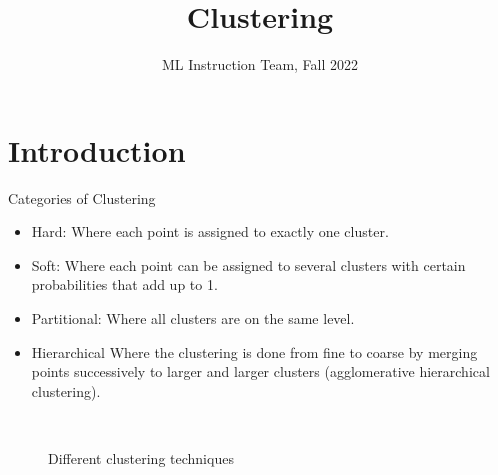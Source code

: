 \documentclass[compress,oilve]{beamer}
\title{Clustering}
\author{ML Instruction Team, Fall 2022}
\institute[]{CE Department \newline  Sharif University of Technology \newline \newline}
\date[\today]{}
\newcommand{\tc}[2]{
	\textcolor{#1}{\hspace{-2pt}#2\hspace{-2pt}}
}
\begin{document}
	
	\fontsize{9}{9}
\begin{frame}
	\titlepage
\end{frame}

\section{Introduction}

\begin{frame}{Categories of Clustering}
	\begin{itemize}
		\item \tc{keywords}{Hard:}Where each point is assigned to
		exactly one cluster.
		
		\medskip
		\item \tc{keywords}{Soft:}Where each point can be assigned to several clusters with certain probabilities that add up to 1.
		
		\medskip
		\item \tc{keywords}{Partitional:}Where all clusters are on the same level.
		
		\medskip
		\item \tc{keywords}{Hierarchical}Where the clustering is done from fine to coarse by merging points successively to larger and larger clusters (agglomerative hierarchical clustering).
		
	\end{itemize}

		\begin{figure}[htbp!]
		\qquad
		\\
		
		\tiny
		\caption{Different clustering techniques}
		\label{fig:globalfigure2}
		
	\end{figure}
	

\end{frame}
\end{document}
